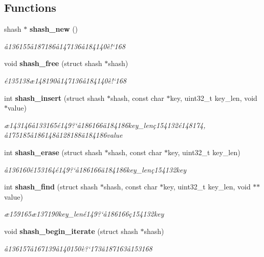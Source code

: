 \subsection*{Functions}
\begin{CompactItemize}
\item 
shash $\ast$ {\bf shash\_\-new} ()
\begin{CompactList}\small\item\em \aa{}136155\aa{}187186\aa{}147136\aa{}184140\`{e}!`168 \item\end{CompactList}\item 
void {\bf shash\_\-free} (struct shash $\ast$shash)
\begin{CompactList}\small\item\em \'{e}135138\ae{}148190\aa{}147136\aa{}184140\`{e}!`168 \item\end{CompactList}\item 
int {\bf shash\_\-insert} (struct shash $\ast$shash, const char $\ast$key, uint32\_\-t key\_\-len, void $\ast$value)
\begin{CompactList}\small\item\em \ae{}143146\aa{}133165\'{e}149?`\aa{}186166\"{a}184186key\_\-len\c{c}154132\'{e}148174, \aa{}175185\aa{}186148\aa{}128188\"{a}184186value \item\end{CompactList}\item 
int {\bf shash\_\-erase} (struct shash $\ast$shash, const char $\ast$key, uint32\_\-t key\_\-len)
\begin{CompactList}\small\item\em \aa{}136160\'{e}153164\'{e}149?`\aa{}186166\"{a}184186key\_\-len\c{c}154132key \item\end{CompactList}\item 
int {\bf shash\_\-find} (struct shash $\ast$shash, const char $\ast$key, uint32\_\-t key\_\-len, void $\ast$$\ast$value)
\begin{CompactList}\small\item\em \ae{}159165\ae{}137190key\_\-len\'{e}149?`\aa{}186166\c{c}154132key \item\end{CompactList}\item 
void {\bf shash\_\-begin\_\-iterate} (struct shash $\ast$shash)
\begin{CompactList}\small\item\em \aa{}136157\aa{}167139\aa{}140150\`{e}?`173\"{a}187163\aa{}153168 \item\end{CompactList}\item 
$$
\end{CompactItemize}
